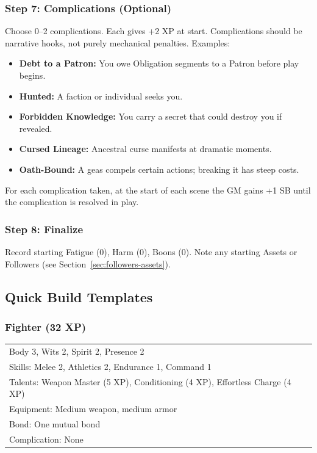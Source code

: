 \subsubsection{Step 7: Complications (Optional)}
Choose 0–2 complications. Each gives +2 XP at start. Complications should be narrative hooks, not purely mechanical penalties. Examples:

\begin{itemize}
  \item \textbf{Debt to a Patron:} You owe Obligation segments to a Patron before play begins.
  \item \textbf{Hunted:} A faction or individual seeks you.
  \item \textbf{Forbidden Knowledge:} You carry a secret that could destroy you if revealed.
  \item \textbf{Cursed Lineage:} Ancestral curse manifests at dramatic moments.
  \item \textbf{Oath-Bound:} A geas compels certain actions; breaking it has steep costs.
\end{itemize}

For each complication taken, at the start of each scene the GM gains +1 SB until the complication is resolved in play.

\subsubsection{Step 8: Finalize}
Record starting Fatigue (0), Harm (0), Boons (0). Note any starting Assets or Followers (see Section~\ref{sec:followers-assets}).

\subsection{Quick Build Templates}

\subsubsection{Fighter (32 XP)}
\begin{tabular}{@{}ll@{}}
Body 3, Wits 2, Spirit 2, Presence 2 \\
Skills: Melee 2, Athletics 2, Endurance 1, Command 1 \\
Talents: Weapon Master (5 XP), Conditioning (4 XP), Effortless Charge (4 XP) \\
Equipment: Medium weapon, medium armor \\
Bond: One mutual bond \\
Complication: None \\
\end{tabular}

